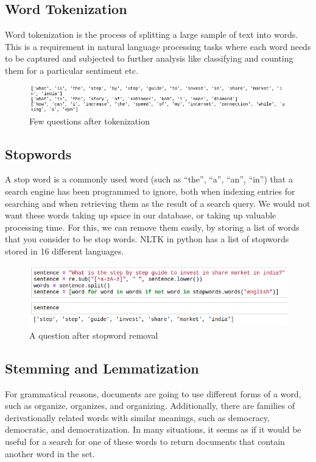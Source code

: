 \subsection{Word Tokenization}
Word tokenization is the process of splitting a large sample of text into words. This is a requirement in natural language processing tasks where each word needs to be captured and subjected to further analysis like classifying and counting them for a particular sentiment etc.

\begin{figure}[tbh]
\begin{center}
	\includegraphics[width = 5.5in]{images/tokenization.png}
	\caption{Few questions after tokenization}
	\label{tokenization}
\end{center}
\end{figure}

\subsection{Stopwords}
A stop word is a commonly used word (such as “the”, “a”, “an”, “in”) that a search engine has been programmed to ignore, both when indexing entries for searching and when retrieving them as the result of a search query. We would not want these words taking up space in our database, or taking up valuable processing time. For this, we can remove them easily, by storing a list of words that you consider to be stop words. \ac{NLTK} in python has a list of stopwords stored in 16 different languages.
\begin{figure}[tbh]
\begin{center}
	\includegraphics[width = 5.5in]{images/stopwords.png}
	\caption{A question after stopword removal}
	\label{stopwords}
\end{center}
\end{figure}

\subsection{Stemming and Lemmatization}
For grammatical reasons, documents are going to use different forms of a word, such as organize, organizes, and organizing. Additionally, there are families of derivationally related words with similar meanings, such as democracy, democratic, and democratization. In many situations, it seems as if it would be useful for a search for one of these words to return documents that contain another word in the set.

